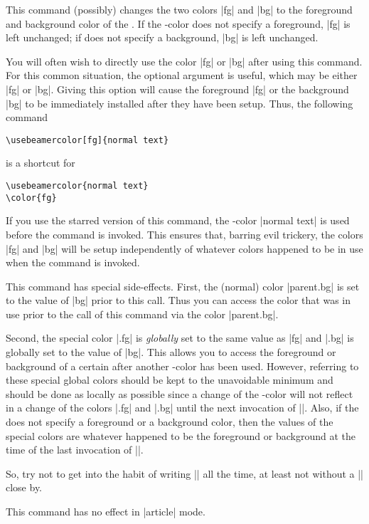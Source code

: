 \begin{command}{\usebeamercolor\opt{|*|}}
  This command (possibly) changes the two colors |fg| and |bg| to the
  foreground and background color of the . If
  the \beamer-color does not specify a foreground, |fg| is left
  unchanged; if does not specify a background, |bg| is left
  unchanged. 

  You will often wish to directly use the color |fg| or |bg| after
  using this command. For this common situation, the optional argument
   is useful, which may be either |fg| or
  |bg|. Giving this option will cause the foreground |fg| or the
  background |bg| to be immediately installed after they have been
  setup. Thus, the following command
\begin{verbatim}
\usebeamercolor[fg]{normal text}
\end{verbatim}
  is a shortcut for
\begin{verbatim}
\usebeamercolor{normal text}
\color{fg}
\end{verbatim}

  If you use the starred version of this command, the \beamer-color
  |normal text| is used before the command is invoked. This ensures
  that, barring evil trickery, the colors |fg| and |bg| will be setup
  independently of whatever colors happened to be in use when the
  command is invoked.

  This command has special side-effects. First, the (normal) color
  |parent.bg| is set to the value of |bg| prior to this call. Thus you
  can access the color that was in use prior to the call of this
  command via the color |parent.bg|.

  Second, the special color |.fg| is \emph{globally}
  set to the same value as |fg| and |.bg| is
  globally set to the value of |bg|. This allows you to access the
  foreground or background of a certain  after
  another \beamer-color has been used. However, referring to these
  special global colors should be kept to the unavoidable minimum and
  should be done as locally as possible since a change of the
  \beamer-color will not reflect in a change of the colors
  |.fg| and |.bg|
  until the next invocation of |\usebeamercolor|. Also, if the
   does not specify a foreground or a
  background color, then the values of the special colors are whatever
  happened to be the foreground or background at the time of the last
  invocation of |\usebeamercolor|.

  So, try not to get into the habit of writing |\color{structure.fg}|
  all the time, at least not without a ||
  close by.

  \articlenote
  This command has no effect in |article| mode.
\end{command}



